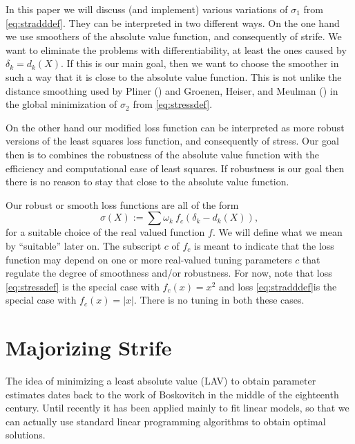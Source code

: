 \documentclass[
  12pt,
  letterpaper,
  DIV=11,
  numbers=noendperiod]{scrartcl}
\newcommand{\sectionbreak}{\pagebreak}
\theoremstyle{definition}
\theoremstyle{plain}
\theoremstyle{plain}
\theoremstyle{remark}
\begin{document}
In this paper we will discuss (and implement) various variations of
\(\sigma_1\) from \eqref{eq:stradddef}. They can be interpreted in two
different ways. On the one hand we use smoothers of the absolute value
function, and consequently of strife. We want to eliminate the problems
with differentiability, at least the ones caused by \(\delta_k=d_k(X)\).
If this is our main goal, then we want to choose the smoother in such a
way that it is close to the absolute value function. This is not unlike
the distance smoothing used by Pliner ()
and Groenen, Heiser, and Meulman
() in the global
minimization of \(\sigma_2\) from \eqref{eq:stressdef}.

On the other hand our modified loss function can be interpreted as more
robust versions of the least squares loss function, and consequently of
stress. Our goal then is to combines the robustness of the absolute
value function with the efficiency and computational ease of least
squares. If robustness is our goal then there is no reason to stay that
close to the absolute value function.

Our robust or smooth loss functions are all of the form \begin{equation}
\sigma(X):=\sum \omega_k\ f_c(\delta_k-d_k(X))\label{eq:strifedef},
\end{equation} for a suitable choice of the real valued function \(f\).
We will define what we mean by ``suitable'' later on. The subscript
\(c\) of \(f_c\) is meant to indicate that the loss function may depend
on one or more real-valued tuning parameters \(c\) that regulate the
degree of smoothness and/or robustness. For now, note that loss
\eqref{eq:stressdef} is the special case with \(f_c(x)=x^2\) and loss
\eqref{eq:stradddef}is the special case with \(f_c(x)=|x|\). There is no
tuning in both these cases.

\sectionbreak

\section{Majorizing Strife}\label{sec-majorization}

The idea of minimizing a least absolute value (LAV) to obtain parameter
estimates dates back to the work of Boskovitch in the middle of the
eighteenth century. Until recently it has been applied mainly to fit
linear models, so that we can actually use standard linear programming
algorithms to obtain optimal solutions.
\end{document}
